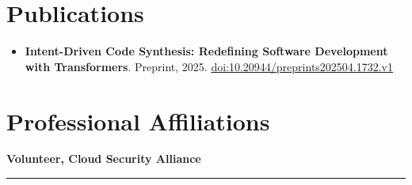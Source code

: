 \documentclass[10pt, letterpaper]{article}
\begin{document}
\vspace{0.04cm}
\section{Publications}
\begin{itemize}[leftmargin=*, itemsep=-1pt]
  \item \textbf{Intent-Driven Code Synthesis: Redefining Software Development with Transformers}. Preprint, 2025. \href{https://doi.org/10.20944/preprints202504.1732.v1}{doi:10.20944/preprints202504.1732.v1}
\end{itemize}

\vspace{0.04cm}
\section{Professional Affiliations}
\textbf{Volunteer, Cloud Security Alliance}

\vspace{0.05cm}
\noindent\textcolor{myAccent}{\rule{\textwidth}{0.0pt}}
\end{document}
